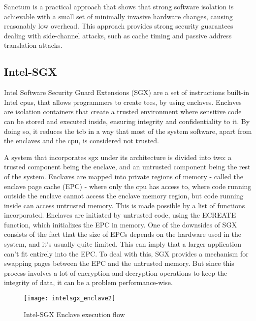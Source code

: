 Sanctum is a practical approach that shows that strong software isolation is achievable with a small set of minimally invasive hardware changes, causing reasonably low overhead. 
This approach provides strong security guarantees dealing with side-channel attacks, such as cache timing and passive address translation attacks.

\subsection{Intel-SGX}
\label{ssec:intelsgx}

Intel Software Security Guard Extensions (SGX) \cite{intelSGX} are a set of instructions built-in Intel \gls{cpu}s, that allows programmers to create \gls{tee}s, by using enclaves. Enclaves are isolation containers that create a trusted environment where sensitive code can be stored and executed inside, ensuring integrity and confidentiality to it. By doing so, it reduces the \gls{tcb} in a way that most of the system software, apart from the enclaves and the \gls{cpu}, is considered not trusted.

A system that incorporates \gls{sgx} under its architecture is divided into two: a trusted component being the enclave, and an untrusted component being the rest of the system.
Enclaves are mapped into private regions of memory - called the enclave page cache (EPC) - where only the \gls{cpu} has access to, where code running outside the enclave cannot access the enclave memory region, but code running inside can access untrusted memory. This is made possible by a list of functions incorporated.
Enclaves are initiated by untrusted code, using the ECREATE function, which initializes the EPC in memory. One of the downsides of SGX consists of the fact that the size of EPCs depends on the hardware used in the system, and it's usually quite limited. This can imply that a larger application can't fit entirely into the EPC. To deal with this, SGX provides a mechanism for swapping pages between the EPC and the untrusted memory. But since this process involves a lot of encryption and decryption operations to keep the integrity of data, it can be a problem performance-wise. 

\begin{figure}[htbp]
	\centering
	{\texttt{[image: intelsgx\_enclave2]}}
	\caption{Intel-SGX Enclave execution flow}
	\label{fig:sgxEnclave}
\end{figure}

